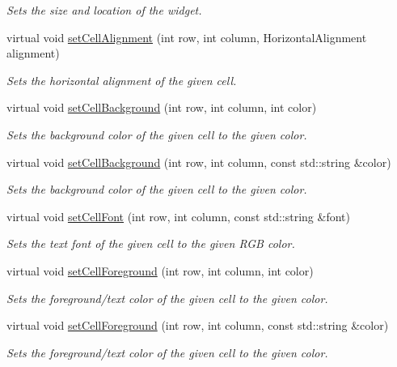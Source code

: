 \begin{DoxyCompactItemize}
\begin{DoxyCompactList}\small\item\em Sets the size and location of the widget. \end{DoxyCompactList}\item 
virtual void \mbox{\hyperlink{classGTable_a0c1ff398e920da7356b8375b66b9b083}{set\+Cell\+Alignment}} (int row, int column, Horizontal\+Alignment alignment)
\begin{DoxyCompactList}\small\item\em Sets the horizontal alignment of the given cell. \end{DoxyCompactList}\item 
virtual void \mbox{\hyperlink{classGTable_a50940b22e500a861451bbff938c8f50b}{set\+Cell\+Background}} (int row, int column, int color)
\begin{DoxyCompactList}\small\item\em Sets the background color of the given cell to the given color. \end{DoxyCompactList}\item 
virtual void \mbox{\hyperlink{classGTable_af2d2fa204d2f9260081102a990310cd7}{set\+Cell\+Background}} (int row, int column, const std\+::string \&color)
\begin{DoxyCompactList}\small\item\em Sets the background color of the given cell to the given color. \end{DoxyCompactList}\item 
virtual void \mbox{\hyperlink{classGTable_a8c3d80b0163f465c7306b075d5895313}{set\+Cell\+Font}} (int row, int column, const std\+::string \&font)
\begin{DoxyCompactList}\small\item\em Sets the text font of the given cell to the given R\+GB color. \end{DoxyCompactList}\item 
virtual void \mbox{\hyperlink{classGTable_a19969b2f2b0cbf219333b02c047b2e7e}{set\+Cell\+Foreground}} (int row, int column, int color)
\begin{DoxyCompactList}\small\item\em Sets the foreground/text color of the given cell to the given color. \end{DoxyCompactList}\item 
virtual void \mbox{\hyperlink{classGTable_ab0bdc2afa7ef003fa5e8ab6eb25a7282}{set\+Cell\+Foreground}} (int row, int column, const std\+::string \&color)
\begin{DoxyCompactList}\small\item\em Sets the foreground/text color of the given cell to the given color. \end{DoxyCompactList}\item 

\end{DoxyCompactItemize}
